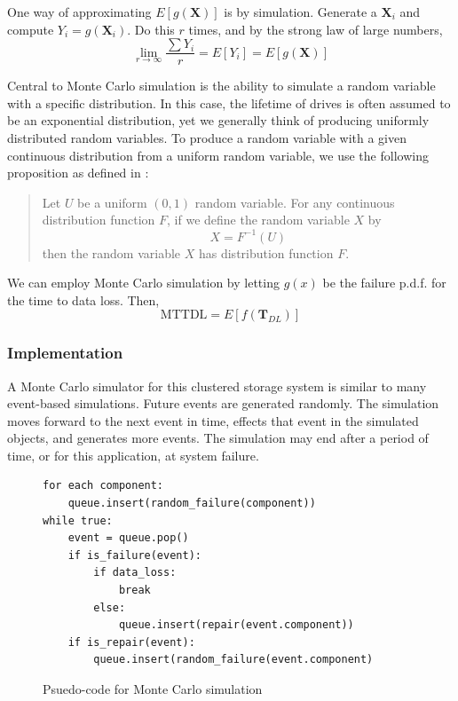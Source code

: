 \documentclass[11pt]{article}
\numberwithin{equation}{section}
\begin{document}
One way of approximating $E[g(\mathbf{X})]$ is by simulation.  Generate a
$\mathbf{X}_{i}$ and compute $Y_{i} = g(\mathbf{X}_{i})$.  Do this $r$ times,
and by the strong law of large numbers, $$\lim_{r \to \infty} \frac{\sum
Y_{i}}{r} = E[Y_{i}] = E[g(\mathbf{X})]$$
    
Central to Monte Carlo simulation is the ability to simulate a random variable
with a specific distribution.  In this case, the lifetime of drives is often
assumed to be an exponential distribution, yet we generally think of producing
uniformly distributed random variables.  To produce a random variable with a
given continuous distribution from a uniform random variable, we use the
following proposition as defined in \cite{prob}:

\begin{quote} 
Let $U$ be a uniform $(0,1)$ random variable.  For any continuous distribution
function $F$, if we define the random variable $X$ by $$X = F^{-1}(U)$$ then
the random variable $X$ has distribution function $F$.
\end{quote}

We can employ Monte Carlo simulation by letting $g(x)$ be the failure p.d.f.
for the time to data loss.  Then,
$$\textrm{MTTDL} = E[f(\mathbf{T}_{DL})]$$

\subsubsection{Implementation}

A Monte Carlo simulator for this clustered storage system is similar to many
event-based simulations.  Future events are generated randomly.  The
simulation moves forward to the next event in time, effects that event in the
simulated objects, and generates more events.  The simulation
may end after a period of time, or for this application, at system failure.

\begin{figure}[h]
\begin{center}
\end{center}
\begin{verbatim}
for each component:
    queue.insert(random_failure(component))
while true:
    event = queue.pop()
    if is_failure(event):
        if data_loss:
            break
        else:
            queue.insert(repair(event.component))
    if is_repair(event):
        queue.insert(random_failure(event.component)
\end{verbatim}
\caption{Psuedo-code for Monte Carlo simulation}
\label{fig-monte-carlo}
\end{figure}
\end{document}
